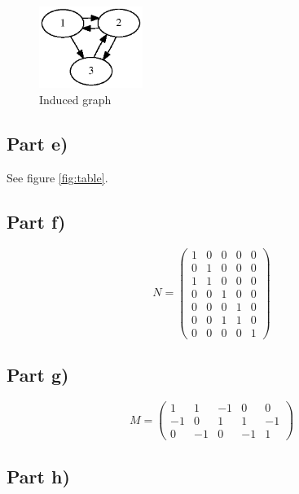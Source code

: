 \documentclass[10pt,a4paper]{article}
\begin{document}
\begin{figure}[h]
  \centering
  \includegraphics[width=0.3\textwidth]{sheet-7/exercise-1-d}
  \caption{Induced graph}
  \label{fig:part-d}
\end{figure}

\subsection*{Part e)}

See figure \ref{fig:table}.

\subsection*{Part f)}

\begin{equation*}
  N = \begin{pmatrix}
    1 & 0 & 0 & 0 & 0\\
    0 & 1 & 0 & 0 & 0\\
    1 & 1 & 0 & 0 & 0\\
    0 & 0 & 1 & 0 & 0\\
    0 & 0 & 0 & 1 & 0\\
    0 & 0 & 1 & 1 & 0\\
    0 & 0 & 0 & 0 & 1
  \end{pmatrix}
\end{equation*}

\subsection*{Part g)}

\begin{equation*}
  M = \begin{pmatrix}
    1 & 1 & -1 & 0 & 0\\
    -1 & 0 & 1 & 1 & -1\\
    0 & -1 & 0 & -1 & 1
  \end{pmatrix}
\end{equation*}

\subsection*{Part h)}
\end{document}

